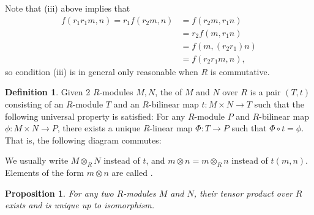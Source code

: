 \documentclass[11pt]{book}
\newcounter{counter}
\newtheorem{proposition}[counter]{Proposition}   \newtheorem{problem}[counter]{Problem}   \newtheorem*{proposition*}{Proposition}   \newtheorem*{lemma*}{Lemma}
\theoremstyle{definition}   \newtheorem{defn}[counter]{Definition} %
\DeclareMathOperator{\ra}{\rightarrow}   \DeclareMathOperator{\Poly}{\mathbf{P}}   \DeclareMathOperator{\spn}{\textnormal{span}}   \DeclareMathOperator{\aut}{\textnormal{Aut}}
\newcommand{\vs}{\vspace{8pt}}   \newcommand{\hs}{\hspace{8pt}}
\numberwithin{counter}{chapter}
\begin{document}
\vs

\begin{remark*}
Note that (iii) above implies that 
\begin{align*}
f(r_1r_1m,n) = r_1f(r_2m,n) &= f(r_2m,r_1n) \\
&= r_2f(m,r_1n) \\
&= f(m,(r_2r_1)n) \\
&= f(r_2r_1m,n),
\end{align*}
so condition (iii) is in general only reasonable when $R$ is commutative. 
\end{remark*}

\vs

\begin{defn}
Given 2 $R$-modules $M,N$, the  of $M$ and $N$ over $R$ is a pair $(T,t)$ consisting of an $R$-module $T$ and an $R$-bilinear map $t : M \times N \ra T$ such that the following universal property is satisfied: For any $R$-module $P$ and $R$-bilinear map $\phi : M \times N \ra P$, there exists a unique $R$-linear map $\Phi : T \ra P$ such that $\Phi \circ t = \phi$. That is, the following diagram commutes:

\end{defn}

\vs

\noindent {} We usually write $M \otimes_R N$ instead of $t$, and $m \otimes n = m \otimes_R n$ instead of $t(m,n)$. Elements of the form $m \otimes n$ are called .

\newpage

\begin{proposition}
For any two $R$-modules $M$ and $N$, their tensor product over $R$ exists and is unique up to isomorphism.
\end{proposition}
\end{document}
